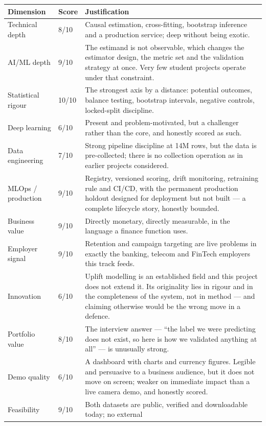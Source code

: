\documentclass[11pt,a4paper]{article}
\begin{document}
\begin{longtable}{@{}L{4.4cm}L{1.6cm}L{8.0cm}@{}}
\toprule
\textbf{Dimension} & \textbf{Score} & \textbf{Justification} \\
\midrule
\endhead
Technical depth & 8/10 & Causal estimation, cross-fitting, bootstrap inference and a production
service; deep without being exotic. \\
AI/ML depth & 9/10 & The estimand is not observable, which changes the estimator design, the
metric set and the validation strategy at once. Very few student projects operate under that
constraint. \\
Statistical rigour & 10/10 & The strongest axis by a distance: potential outcomes, balance testing,
bootstrap intervals, negative controls, locked-split discipline. \\
Deep learning & 6/10 & Present and problem-motivated, but a challenger rather than the core, and
honestly scored as such. \\
Data engineering & 7/10 & Strong pipeline discipline at 14M rows, but the data is pre-collected;
there is no collection operation as in earlier projects considered. \\
MLOps / production & 9/10 & Registry, versioned scoring, drift monitoring, retraining rule and
CI/CD, with the permanent production holdout designed for deployment but not built --- a complete
lifecycle story, honestly bounded. \\
Business value & 9/10 & Directly monetary, directly measurable, in the language a finance function
uses. \\
Employer signal & 9/10 & Retention and campaign targeting are live problems in exactly the banking,
telecom and FinTech employers this track feeds. \\
Innovation & 6/10 & Uplift modelling is an established field and this project does not extend it.
Its originality lies in rigour and in the completeness of the system, not in method --- and
claiming otherwise would be the wrong move in a defence. \\
Portfolio value & 8/10 & The interview answer --- ``the label we were predicting does not exist, so
here is how we validated anything at all'' --- is unusually strong. \\
Demo quality & 6/10 & A dashboard with charts and currency figures. Legible and persuasive to a
business audience, but it does not move on screen; weaker on immediate impact than a live camera
demo, and honestly scored. \\
Feasibility & 9/10 & Both datasets are public, verified and downloadable today; no external

\end{longtable}
\end{document}
